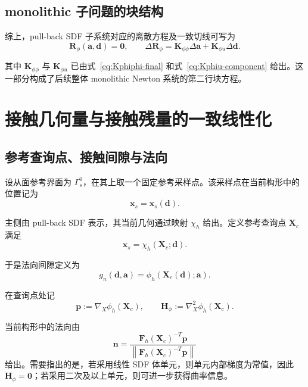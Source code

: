 \documentclass[12pt,a4paper]{ctexart}
\numberwithin{equation}{section}
\newcommand{\bF}{\bm{F}}
\newcommand{\bn}{\bm{n}}
\newcommand{\bp}{\bm{p}}
\newcommand{\bH}{\bm{H}}
\newcommand{\bd}{\bm{d}}
\newcommand{\ba}{\bm{a}}
\newcommand{\bx}{\bm{x}}
\newcommand{\bX}{\bm{X}}
\newcommand{\gradX}{\nabla_{\!X}}
\newcommand{\norm}[1]{\left\lVert #1 \right\rVert}
\begin{document}
\subsection{monolithic 子问题的块结构}

综上，pull-back SDF 子系统对应的离散方程及一致切线可写为
\begin{equation}
\boxed{
\bm{R}_\phi(\ba,\bd)=\bm{0},
\qquad
\Delta \bm{R}_\phi
=
\bm{K}_{\phi\phi}\Delta\ba + \bm{K}_{\phi u}\Delta\bd.
}
\label{eq:sdf-subsystem-linearized}
\end{equation}

其中 $\bm{K}_{\phi\phi}$ 与 $\bm{K}_{\phi u}$ 已由式~\eqref{eq:Kphiphi-final} 和式~\eqref{eq:Kphiu-component} 给出。这一部分构成了后续整体 monolithic Newton 系统的第二行块方程。

\section{接触几何量与接触残量的一致线性化}\label{sec:contact-coupling}

\subsection{参考查询点、接触间隙与法向}

设从面参考界面为 $\Gamma_s^0$，在其上取一个固定参考采样点。该采样点在当前构形中的位置记为
\begin{equation}
\bx_s = \bx_s(\bd).
\end{equation}

主侧由 pull-back SDF 表示，其当前几何通过映射 $\chi_h$ 给出。定义参考查询点 $\bX_c$ 满足
\begin{equation}
\bx_s = \chi_h(\bX_c;\bd).
\label{eq:implicit-query-point}
\end{equation}

于是法向间隙定义为
\begin{equation}
\boxed{
g_n(\bd,\ba)=\phi_h(\bX_c(\bd);\ba).
}
\label{eq:gn-def}
\end{equation}

在查询点处记
\begin{equation}
\bp := \gradX \phi_h(\bX_c),
\qquad
\bH_\phi := \nabla_X^2 \phi_h(\bX_c).
\end{equation}

当前构形中的法向由
\begin{equation}
\bn=
\frac{\bF_h(\bX_c)^{-T}\bp}{\norm{\bF_h(\bX_c)^{-T}\bp}}
\label{eq:normal-query}
\end{equation}
给出。需要指出的是，若采用线性 SDF 体单元，则单元内部梯度为常值，因此 $\bH_\phi=\bm{0}$；若采用二次及以上单元，则可进一步获得曲率信息。
\end{document}
